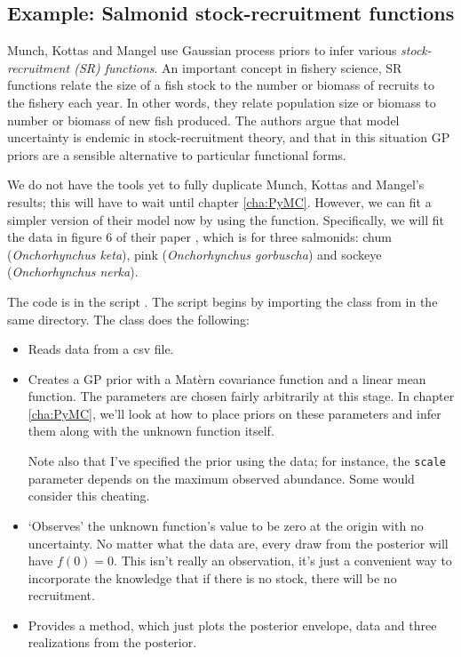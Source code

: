 \subsection{Example: Salmonid stock-recruitment functions}\label{sub:MMKregression}
Munch, Kottas and Mangel \cite{mmk} use Gaussian process priors to infer various \emph{stock-recruitment (SR) functions}. An important concept in fishery science, SR functions relate the size of a fish stock to the number or biomass of recruits to the fishery each year. In other words, they relate population size or biomass to number or biomass of new fish produced. The authors argue that model uncertainty is endemic in stock-recruitment theory, and that in this situation GP priors are a sensible alternative to particular functional forms.

We do not have the tools yet to fully duplicate Munch, Kottas and Mangel's results; this will have to wait until chapter \ref{cha:PyMC}. However, we can fit a simpler version of their model now by using the  function. Specifically, we will fit the data in figure 6 of their paper \cite{mmk}, which is for three salmonids: chum (\emph{Onchorhynchus keta}), pink (\emph{Onchorhynchus gorbuscha}) and sockeye (\emph{Onchorhynchus nerka}).

The code is in the script . The script begins by importing the  class from  in the same directory.
The  class does the following:
\begin{itemize}
    \item Reads data from a csv file.
    \item Creates a GP prior with a Mat\`ern covariance function and a linear mean function. The parameters are chosen fairly arbitrarily at this stage. In chapter \ref{cha:PyMC}, we'll look at how to place priors on these parameters and infer them along with the unknown function itself.

    Note also that I've specified the prior using the data; for instance, the \texttt{scale} parameter depends on the maximum observed abundance. Some would consider this cheating.
    \item `Observes' the unknown function's value to be zero at the origin with no uncertainty. No matter what the data are, every draw from the posterior will have $f(0) = 0$. This isn't really an observation, it's just a convenient way to incorporate the knowledge that if there is no stock, there will be no recruitment.
    \item Provides a  method, which just plots the posterior envelope, data and three realizations from the posterior.
\end{itemize}
% 

